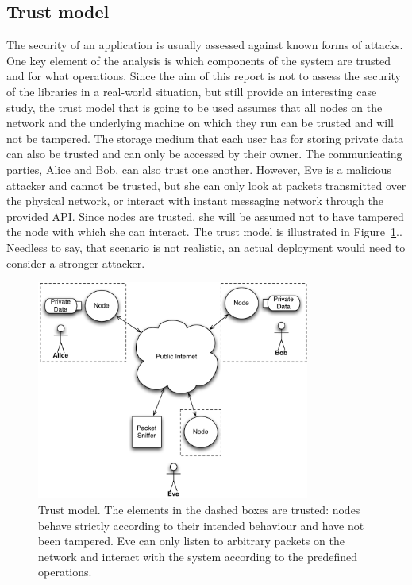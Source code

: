 \subsection{Trust model}

The security of an application is usually assessed against known forms of attacks. One key element of the analysis is which components of the system are trusted and for what operations. Since the aim of this report is not to assess the security of the libraries in a real-world situation, but still provide an interesting case study, the trust model that is going to be used assumes that all nodes on the network and the underlying machine on which they run can be trusted and will not be tampered. The storage medium that each user has for storing private data can also be trusted and can only be accessed by their owner. The communicating parties, Alice and Bob, can also trust one another. However, Eve is a malicious attacker and cannot be trusted, but she can only look at packets transmitted over the physical network, or interact with instant messaging network through the provided API. Since nodes are trusted, she will be assumed not to have tampered the node with which she can interact. The trust model is illustrated in Figure~\ref{fig:TrustModel}.. Needless to say, that scenario is not realistic, an actual deployment would need to consider a stronger attacker. 

\begin{figure}[htb]
\begin{center}
\includegraphics[width=0.8\textwidth]{figures/TrustModel}
\caption[Trust model]{\label{fig:TrustModel} Trust model. The elements in the dashed boxes are trusted: nodes behave strictly according to their intended behaviour and have not been tampered. Eve can only listen to arbitrary packets on the network and interact with the system according to the predefined operations.}
\end{center}
\end{figure}

